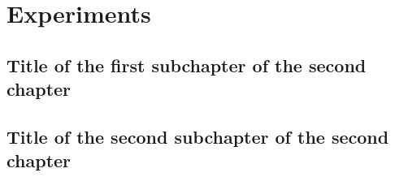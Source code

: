 \chapter{Experiments}

\section{Title of the first subchapter of the second chapter}

\section{Title of the second subchapter of the second chapter}
